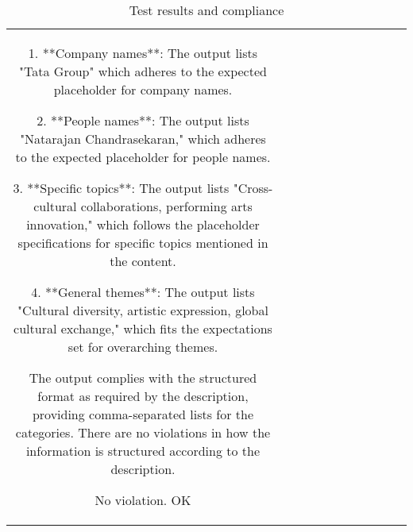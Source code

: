 \begin{table}[h!]
\begin{tabular}{|c|c|c|c|c|c|c|c|c|c|c|}
1. **Company names**: The output lists "Tata Group" which adheres to the expected placeholder for company names.

2. **People names**: The output lists "Natarajan Chandrasekaran," which adheres to the expected placeholder for people names.

3. **Specific topics**: The output lists "Cross-cultural collaborations, performing arts innovation," which follows the placeholder specifications for specific topics mentioned in the content.

4. **General themes**: The output lists "Cultural diversity, artistic expression, global cultural exchange," which fits the expectations set for overarching themes.

The output complies with the structured format as required by the description, providing comma-separated lists for the categories. There are no violations in how the information is structured according to the description.

No violation.
OK
  \end{tabular}
  \caption{Test results and compliance}
  
  \end{table}
  